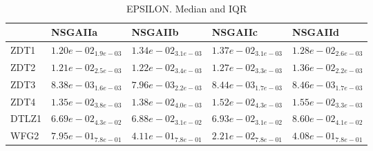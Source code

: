 \documentclass{article}
\begin{document}
\
\begin{table}
\caption{EPSILON. Median and IQR}
\label{table:median.EPSILON}
\begin{scriptsize}
\centering
\begin{tabular}{lllll}
\hline & NSGAIIa & NSGAIIb & NSGAIIc &  NSGAIId\\
\hline
ZDT1 & \cellcolor{gray95}$  1.20e-02_{ 1.9e-03}$ & $  1.34e-02_{ 3.1e-03}$ & $  1.37e-02_{ 3.1e-03}$ & $  1.28e-02_{ 2.6e-03}$ \\
ZDT2 & \cellcolor{gray95}$  1.21e-02_{ 2.5e-03}$ & \cellcolor{gray25}$  1.22e-02_{ 3.4e-03}$ & $  1.27e-02_{ 3.3e-03}$ & $  1.36e-02_{ 2.2e-03}$ \\
ZDT3 & \cellcolor{gray25}$  8.38e-03_{ 1.6e-03}$ & \cellcolor{gray95}$  7.96e-03_{ 2.2e-03}$ & $  8.44e-03_{ 1.7e-03}$ & $  8.46e-03_{ 1.7e-03}$ \\
ZDT4 & \cellcolor{gray95}$  1.35e-02_{ 3.8e-03}$ & \cellcolor{gray25}$  1.38e-02_{ 4.0e-03}$ & $  1.52e-02_{ 4.3e-03}$ & $  1.55e-02_{ 3.3e-03}$ \\
DTLZ1 & \cellcolor{gray95}$  6.69e-02_{ 4.3e-02}$ & \cellcolor{gray25}$  6.88e-02_{ 3.1e-02}$ & $  6.93e-02_{ 3.1e-02}$ & $  8.60e-02_{ 4.1e-02}$ \\
WFG2 & $  7.95e-01_{ 7.8e-01}$ & $  4.11e-01_{ 7.8e-01}$ & \cellcolor{gray95}$  2.21e-02_{ 7.8e-01}$ & $  4.08e-01_{ 7.8e-01}$ \\
\hline
\end{tabular}
\end{scriptsize}
\end{table}
\end{document}

